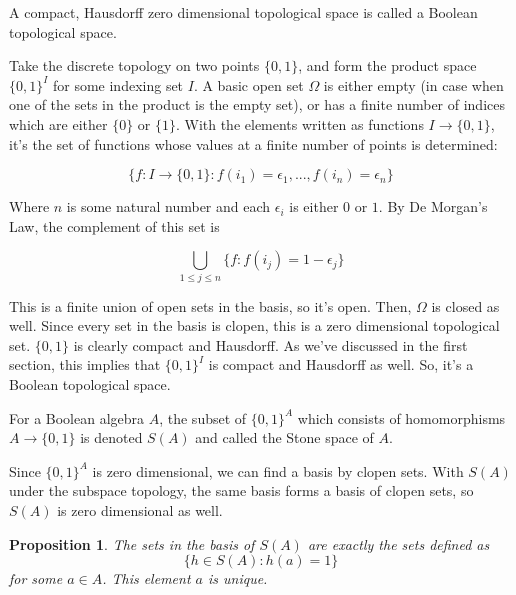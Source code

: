\documentclass{article}
\newtheorem*{proposition}{Proposition}
\begin{document}
        A compact, Hausdorff zero dimensional topological space is called a
        Boolean topological space.

        Take the discrete topology on two points $\{0,1\}$, and form the product
        space $\{0,1\}^I$ for some indexing set $I$. A basic open set $\Omega$
        is either empty (in case when one of the sets in the product is the
        empty set), or has a finite number of indices which are either $\{0\}$
        or $\{1\}$.  With the elements written as functions $I \rightarrow
        \{0,1\}$, it's the set of functions whose values at a finite number of
        points is determined:

        \[\{f: I \rightarrow \{0,1\}: f(i_1) = \epsilon_1, ..., f(i_n) =
        \epsilon_n\}\]

        Where $n$ is some natural number and each $\epsilon_i$ is either $0$ or
        $1$. By De Morgan's Law, the complement of this set is

        \[\bigcup_{1 \leq j \leq n} \{f : f(i_j) = 1 - \epsilon_j\}\]

        This is a finite union of open sets in the basis, so it's open. Then,
        $\Omega$ is closed as well. Since every set in the basis is clopen, this
        is a zero dimensional topological set. $\{0,1\}$ is clearly compact and
        Hausdorff. As we've discussed in the first section, this implies that
        $\{0,1\}^I$ is compact and Hausdorff as well. So, it's a Boolean
        topological space.


      For a Boolean algebra $A$, the subset of $\{0,1\}^A$ which consists of
      homomorphisms $A \rightarrow \{0,1\}$ is denoted $S(A)$ and called the
      Stone space of $A$.

      Since $\{0,1\}^A$ is zero dimensional, we can find a basis by
      clopen sets. With $S(A)$ under the subspace topology, the same basis forms
      a basis of clopen sets, so $S(A)$ is zero dimensional as well.

      \begin{proposition}
        The sets in the basis of $S(A)$ are exactly the sets defined
        as \[\{h\in S(A): h(a) = 1\}\] for some $a \in A$. This element $a$ is
        unique.
      \end{proposition}
\end{document}
